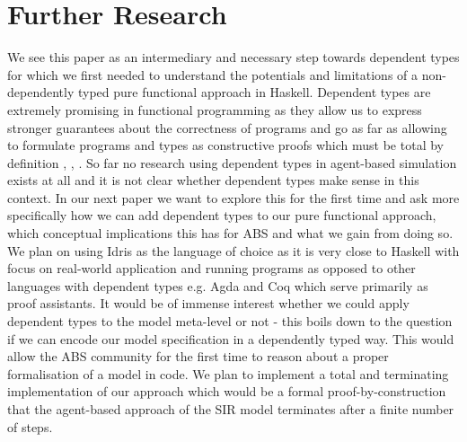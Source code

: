 \section{Further Research}
\label{sec:further_research}
We see this paper as an intermediary and necessary step towards dependent types for which we first needed to understand the potentials and limitations of a non-dependently typed pure functional approach in Haskell. Dependent types are extremely promising in functional programming as they allow us to express stronger guarantees about the correctness of programs and go as far as allowing to formulate programs and types as constructive proofs which must be total by definition \cite{thompson_type_1991}, \cite{altenkirch_why_2005}, \cite{altenkirch_pi_2010}. So far no research using dependent types in agent-based simulation exists at all and it is not clear whether dependent types make sense in this context. In our next paper we want to explore this for the first time and ask more specifically how we can add dependent types to our pure functional approach, which conceptual implications this has for ABS and what we gain from doing so. We plan on using Idris \cite{brady_idris_2013} as the language of choice as it is very close to Haskell with focus on real-world application and running programs as opposed to other languages with dependent types e.g. Agda and Coq which serve primarily as proof assistants.
It would be of immense interest whether we could apply dependent types to the model meta-level or not - this boils down to the question if we can encode our model specification in a dependently typed way. This would allow the ABS community for the first time to reason about a proper formalisation of a model in code. We plan to implement a total and terminating implementation of our approach which would be a formal proof-by-construction that the agent-based approach of the SIR model terminates after a finite number of steps.